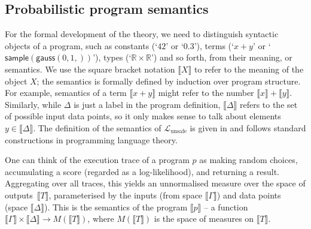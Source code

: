 \documentclass[preprint]{uai2026} %
\newcommand{\RR}{\mathbb{R}}
\newcommand{\sem}[1]{\llbracket #1 \rrbracket}
\newcommand{\Lunsafe}{\mathcal{L}_{\text{unsafe}}}
\newcommand{\gauss}[2]{\mathsf{gauss}(#1,#2)}
\newcommand{\sample}[1]{\mathsf{sample}(#1)}
\newcommand{\datavar}[1]{\mathtt{#1}}
\begin{document}
\subsection{Probabilistic program semantics}\label{sec:semantics}


For the formal development of the theory, we need to distinguish syntactic objects of a program, such as constants (`$42$' or `$0.3$'), terms (`$x + y$' or `$\sample{\gauss{0, 1}}$'), types (`$\RR \times \RR$') and so forth, from their meaning, or semantics. We use the square bracket notation $\sem{X}$ to refer to the meaning of the object $X$; the semantics is formally defined by induction over program structure. For example, semantics of a term $\sem{x + y}$ might refer to the number $\sem{x} + \sem{y}$. Similarly, while $\Delta$ is just a label in the program definition, $\sem{\Delta}$ refers to the set of possible input data points, so it only makes sense to talk about elements $y\in\sem{\Delta}$. The definition of the semantics of $\Lunsafe$ is given in  and follows standard constructions in programming language theory.

One can think of the execution trace of a program $p$ as making random choices, accumulating a score (regarded as a log-likelihood), and returning a result. Aggregating over all traces, this yields an unnormalised measure over the space of outputs~$\sem{T}$, parameterised by the inputs (from space $\sem{\Gamma}$) and data points (space $\sem{\Delta}$). This is the semantics of the program $\sem{p}$ -- a function $\sem{\Gamma}\times \sem{\Delta}\to M(\sem{T})$, where $M(\sem{T})$ is the space of measures on $\sem{T}$. 


\end{document}
